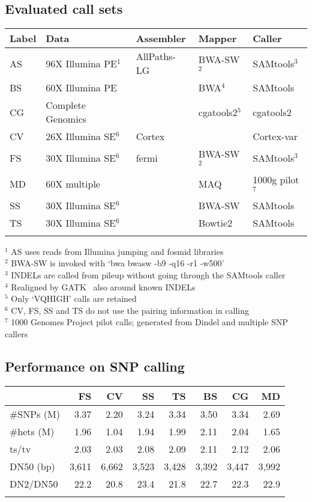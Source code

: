 \documentclass{bioinfo}
\begin{document}
\subsection{Evaluated call sets}

\begin{table}[!htb]
{\begin{tabular}{lllll}
\toprule
Label & Data & Assembler & Mapper & Caller \\
\midrule
AS & 96X Illumina PE$^1$ & AllPaths-LG & BWA-SW$^2$ & SAMtools$^3$ \\
BS & 60X Illumina PE & & BWA$^4$ & SAMtools \\
CG & Complete Genomics& & cgatools2$^5$ & cgatools2 \\
CV & 26X Illumina SE$^6$ & Cortex & & Cortex-var \\
FS & 30X Illumina SE$^6$ & fermi & BWA-SW$^2$ & SAMtools$^3$ \\
MD & 60X multiple        & & MAQ & 1000g pilot$^7$ \\
SS & 30X Illumina SE$^6$ & & BWA-SW & SAMtools \\
TS & 30X Illumina SE$^6$ & & Bowtie2 & SAMtools \\
\botrule
\end{tabular}}{
$^1$ AS uses reads from Illumina jumping and fosmid libraries\\
$^2$ BWA-SW is invoked with `bwa bwasw -b9 -q16 -r1 -w500'\\
$^3$ INDELs are called from pileup without going through the SAMtools caller\\
$^4$ Realigned by GATK~\citep{Depristo:2011vn} also around known INDELs\\
$^5$ Only `VQHIGH' calls are retained\\
$^6$ CV, FS, SS and TS do not use the pairing information in calling\\
$^7$ 1000 Genomes Project pilot calls; generated from Dindel and multiple SNP callers\\
}
\end{table}

\subsection{Performance on SNP calling}

\begin{table}[!htb]
{\begin{tabular}{p{1.5cm}rrrrrrr}
\toprule
& FS & CV & SS & TS & BS & CG & MD \\
\midrule
\#SNPs (M) & 3.37 & 2.20 & 3.24 & 3.34 & 3.50 & 3.34 & 2.69\\
\#hets (M) & 1.96 & 1.04 & 1.94 & 1.99 & 2.11 & 2.04 & 1.65\\
ts/tv      & 2.03 & 2.03 & 2.08 & 2.09 & 2.11 & 2.12 & 2.06\\
DN50 (bp)  & 3,611& 6,662& 3,523& 3,428& 3,392& 3,447&3,992\\
DN2/DN50   & 22.2 & 20.8 & 23.4 & 21.8 & 22.7 & 22.3 & 22.9\\
\botrule
\end{tabular}}{}
\end{table}
\end{document}
